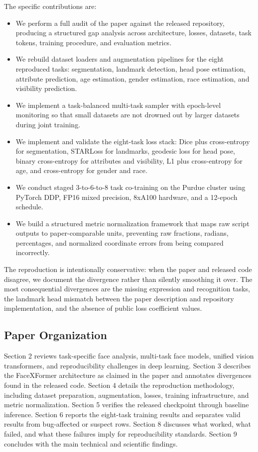 \documentclass[11pt]{article}
\begin{document}
The specific contributions are:


\begin{itemize}[leftmargin=*]
\item We perform a full audit of the paper against the released repository, producing a structured gap analysis across architecture, losses, datasets, task tokens, training procedure, and evaluation metrics.
\item We rebuild dataset loaders and augmentation pipelines for the eight reproduced tasks: segmentation, landmark detection, head pose estimation, attribute prediction, age estimation, gender estimation, race estimation, and visibility prediction.
\item We implement a task-balanced multi-task sampler with epoch-level monitoring so that small datasets are not drowned out by larger datasets during joint training.
\item We implement and validate the eight-task loss stack: Dice plus cross-entropy for segmentation, STARLoss for landmarks, geodesic loss for head pose, binary cross-entropy for attributes and visibility, L1 plus cross-entropy for age, and cross-entropy for gender and race.
\item We conduct staged 3-to-6-to-8 task co-training on the Purdue cluster using PyTorch DDP, FP16 mixed precision, 8xA100 hardware, and a 12-epoch schedule.
\item We build a structured metric normalization framework that maps raw script outputs to paper-comparable units, preventing raw fractions, radians, percentages, and normalized coordinate errors from being compared incorrectly.
\end{itemize}

The reproduction is intentionally conservative: when the paper and released code disagree, we document the divergence rather than silently smoothing it over. The most consequential divergences are the missing expression and recognition tasks, the landmark head mismatch between the paper description and repository implementation, and the absence of public loss coefficient values.


\subsection{Paper Organization}


Section 2 reviews task-specific face analysis, multi-task face models, unified vision transformers, and reproducibility challenges in deep learning. Section 3 describes the FaceXFormer architecture as claimed in the paper and annotates divergences found in the released code. Section 4 details the reproduction methodology, including dataset preparation, augmentation, losses, training infrastructure, and metric normalization. Section 5 verifies the released checkpoint through baseline inference. Section 6 reports the eight-task training results and separates valid results from bug-affected or suspect rows. Section 8 discusses what worked, what failed, and what these failures imply for reproducibility standards. Section 9 concludes with the main technical and scientific findings.
\end{document}

